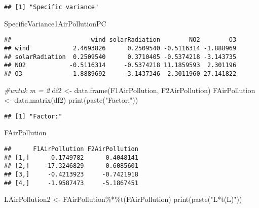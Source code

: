 \documentclass[
]{article}
\newenvironment{Shaded}{\begin{snugshade}}{\end{snugshade}}
\newcommand{\CommentTok}[1]{\textcolor[rgb]{0.56,0.35,0.01}{\textit{#1}}}
\newcommand{\FunctionTok}[1]{\textcolor[rgb]{0.00,0.00,0.00}{#1}}
\newcommand{\NormalTok}[1]{#1}
\newcommand{\OtherTok}[1]{\textcolor[rgb]{0.56,0.35,0.01}{#1}}
\newcommand{\SpecialCharTok}[1]{\textcolor[rgb]{0.00,0.00,0.00}{#1}}
\newcommand{\StringTok}[1]{\textcolor[rgb]{0.31,0.60,0.02}{#1}}
\begin{document}
\begin{verbatim}
## [1] "Specific variance"
\end{verbatim}

\begin{Shaded}
\begin{Highlighting}[]
\NormalTok{SpecificVariance1AirPollutionPC}
\end{Highlighting}
\end{Shaded}

\begin{verbatim}
##                      wind solarRadiation        NO2        O3
## wind            2.4693826      0.2509540 -0.5116314 -1.888969
## solarRadiation  0.2509540      0.3710405 -0.5374218 -3.143735
## NO2            -0.5116314     -0.5374218 11.1859593  2.301196
## O3             -1.8889692     -3.1437346  2.3011960 27.141822
\end{verbatim}

\begin{Shaded}
\begin{Highlighting}[]
\CommentTok{\#untuk m = 2}
\NormalTok{df2 }\OtherTok{\textless{}{-}} \FunctionTok{data.frame}\NormalTok{(F1AirPollution, F2AirPollution)}
\NormalTok{FAirPollution }\OtherTok{\textless{}{-}} \FunctionTok{data.matrix}\NormalTok{(df2)}
\FunctionTok{print}\NormalTok{(}\FunctionTok{paste}\NormalTok{(}\StringTok{"Factor:"}\NormalTok{))}
\end{Highlighting}
\end{Shaded}

\begin{verbatim}
## [1] "Factor:"
\end{verbatim}

\begin{Shaded}
\begin{Highlighting}[]
\NormalTok{FAirPollution}
\end{Highlighting}
\end{Shaded}

\begin{verbatim}
##      F1AirPollution F2AirPollution
## [1,]      0.1749782      0.4048141
## [2,]    -17.3246829      0.6085601
## [3,]     -0.4213923     -0.7421918
## [4,]     -1.9587473     -5.1867451
\end{verbatim}

\begin{Shaded}
\begin{Highlighting}[]
\NormalTok{LAirPollution2 }\OtherTok{\textless{}{-}}\NormalTok{ FAirPollution}\SpecialCharTok{\%*\%}\FunctionTok{t}\NormalTok{(FAirPollution)}
\FunctionTok{print}\NormalTok{(}\FunctionTok{paste}\NormalTok{(}\StringTok{"L*t(L)"}\NormalTok{))}
\end{Highlighting}
\end{Shaded}
\end{document}
